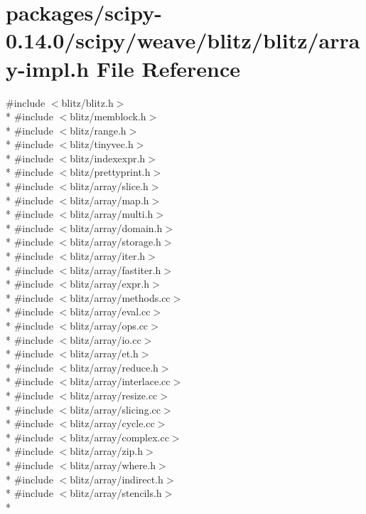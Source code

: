 \hypertarget{array-impl_8h}{}\section{packages/scipy-\/0.14.0/scipy/weave/blitz/blitz/array-\/impl.h File Reference}
\label{array-impl_8h}
{\ttfamily \#include $<$blitz/blitz.\+h$>$}\\*
{\ttfamily \#include $<$blitz/memblock.\+h$>$}\\*
{\ttfamily \#include $<$blitz/range.\+h$>$}\\*
{\ttfamily \#include $<$blitz/tinyvec.\+h$>$}\\*
{\ttfamily \#include $<$blitz/indexexpr.\+h$>$}\\*
{\ttfamily \#include $<$blitz/prettyprint.\+h$>$}\\*
{\ttfamily \#include $<$blitz/array/slice.\+h$>$}\\*
{\ttfamily \#include $<$blitz/array/map.\+h$>$}\\*
{\ttfamily \#include $<$blitz/array/multi.\+h$>$}\\*
{\ttfamily \#include $<$blitz/array/domain.\+h$>$}\\*
{\ttfamily \#include $<$blitz/array/storage.\+h$>$}\\*
{\ttfamily \#include $<$blitz/array/iter.\+h$>$}\\*
{\ttfamily \#include $<$blitz/array/fastiter.\+h$>$}\\*
{\ttfamily \#include $<$blitz/array/expr.\+h$>$}\\*
{\ttfamily \#include $<$blitz/array/methods.\+cc$>$}\\*
{\ttfamily \#include $<$blitz/array/eval.\+cc$>$}\\*
{\ttfamily \#include $<$blitz/array/ops.\+cc$>$}\\*
{\ttfamily \#include $<$blitz/array/io.\+cc$>$}\\*
{\ttfamily \#include $<$blitz/array/et.\+h$>$}\\*
{\ttfamily \#include $<$blitz/array/reduce.\+h$>$}\\*
{\ttfamily \#include $<$blitz/array/interlace.\+cc$>$}\\*
{\ttfamily \#include $<$blitz/array/resize.\+cc$>$}\\*
{\ttfamily \#include $<$blitz/array/slicing.\+cc$>$}\\*
{\ttfamily \#include $<$blitz/array/cycle.\+cc$>$}\\*
{\ttfamily \#include $<$blitz/array/complex.\+cc$>$}\\*
{\ttfamily \#include $<$blitz/array/zip.\+h$>$}\\*
{\ttfamily \#include $<$blitz/array/where.\+h$>$}\\*
{\ttfamily \#include $<$blitz/array/indirect.\+h$>$}\\*
{\ttfamily \#include $<$blitz/array/stencils.\+h$>$}\\*
